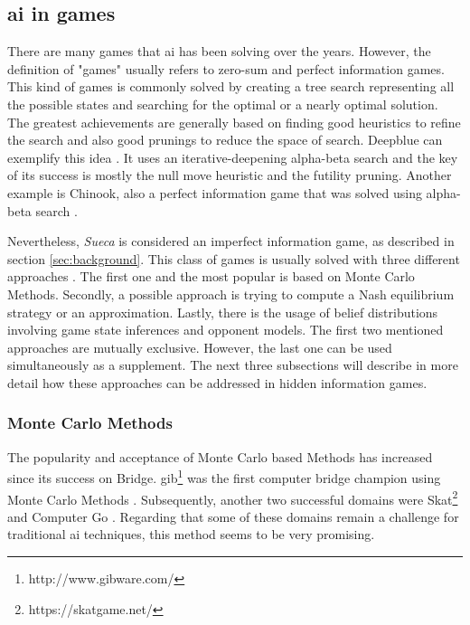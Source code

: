 \subsection{\gls{ai} in games}
 
There are many games that \gls{ai} has been solving over the years.
However, the definition of "games" usually refers to zero-sum and perfect information games.
This kind of games is commonly solved by creating a tree search representing all the possible states and searching for the optimal or a nearly optimal solution.
The greatest achievements are generally based on finding good heuristics to refine the search and also good prunings to reduce the space of search.
Deepblue can exemplify this idea \cite{Campbell2002}.
It uses an iterative-deepening alpha-beta search and the key of its success is mostly the null move heuristic and the futility pruning.
Another example is Chinook, also a perfect information game that was solved using alpha-beta search \cite{Schaeffer1996}.

Nevertheless, \emph{Sueca} is considered an imperfect information game, as described in section \ref{sec:background}.
This class of games is usually solved with three different approaches \cite{Cowling2012}.
The first one and the most popular is based on Monte Carlo Methods.
Secondly, a possible approach is trying to compute a Nash equilibrium strategy or an approximation.
Lastly, there is the usage of belief distributions involving game state inferences and opponent models.
The first two mentioned approaches are mutually exclusive.
However, the last one can be used simultaneously as a supplement.
The next three subsections will describe in more detail how these approaches can be addressed in hidden information games.





\subsubsection{Monte Carlo Methods}

The popularity and acceptance of Monte Carlo based Methods has increased since its success on Bridge.
\gls{gib}\footnote{http://www.gibware.com/} was the first computer bridge champion using Monte Carlo Methods \cite{Ginsberg2001}.
Subsequently, another two successful domains were Skat\footnote{https://skatgame.net/} and Computer Go \cite{Gelly2011}.
Regarding that some of these domains remain a challenge for traditional \gls{ai} techniques, this method seems to be very promising.



